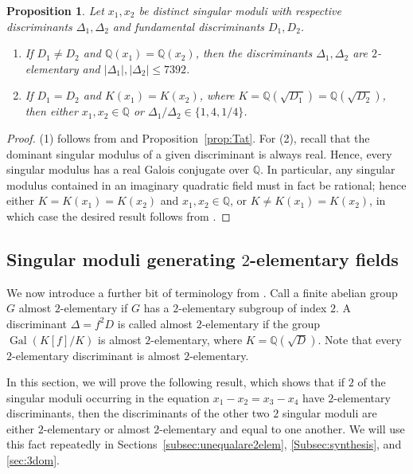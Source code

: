 \documentclass[12pt,a4paper,oneside]{amsart}
\newtheorem{proposition}[theorem]{Proposition}
\DeclareMathOperator{\gal}{Gal}
\begin{document}
\begin{proposition}\label{prop:1field}
    Let $x_1, x_2$ be distinct singular moduli with respective discriminants $\Delta_1, \Delta_2$ and fundamental discriminants $D_1, D_2$.
    \begin{enumerate}
        \item If $D_1 \neq D_2$ and $\mathbb{Q}(x_1) = \mathbb{Q}(x_2)$, then the discriminants $\Delta_1, \Delta_2$ are $2$-elementary and $\lvert \Delta_1 \rvert, \lvert \Delta_2 \rvert \leq 7392$.
        \item If $D_1 = D_2$ and $K(x_1) = K(x_2)$, where $K = \mathbb{Q}(\sqrt{D_1}) = \mathbb{Q}(\sqrt{D_2})$, then either $x_1, x_2 \in \mathbb{Q}$ or $\Delta_1/\Delta_2 \in \{1, 4, 1/4\}$.
    \end{enumerate}
\end{proposition}

\begin{proof}
    (1) follows from \cite[Prop.~2.8 \& Cor.~2.13]{BiluGunTron22} and Proposition~\ref{prop:Tat}. For (2), recall that the dominant singular modulus of a given discriminant is always real. Hence, every singular modulus has a real Galois conjugate over $\mathbb{Q}$. In particular, any singular modulus contained in an imaginary quadratic field must in fact be rational; hence either $K=K(x_1)=K(x_2)$ and $x_1, x_2 \in \mathbb Q$, or $K \neq K(x_1)=K(x_2)$, in which case the desired result follows from \cite[Lemma~7.2]{BiluFayeZhu19}.
\end{proof}

\subsection{Singular moduli generating \texorpdfstring{$2$}{2}-elementary fields}\label{subsec:2elemfields}



We now introduce a further bit of terminology from \cite[\S2.2.2]{BiluGunTron22}. Call a finite abelian group $G$ almost $2$-elementary if $G$ has a $2$-elementary subgroup of index $2$. A discriminant $\Delta = f^2 D$ is called almost $2$-elementary if the group $\gal(K[f] / K)$ is almost $2$-elementary, where $K = \mathbb{Q} (\sqrt{D})$. Note that every $2$-elementary discriminant is almost $2$-elementary.

In this section, we will prove the following result, which shows that if $2$ of the singular moduli occurring in the equation $x_1 - x_2 = x_3 - x_4$ have $2$-elementary discriminants, then the discriminants of the other two $2$ singular moduli are either $2$-elementary or almost $2$-elementary and equal to one another.
We will use this fact repeatedly in Sections~\ref{subsec:unequalare2elem}, \ref{Subsec:synthesis}, and \ref{sec:3dom}.
\end{document}
